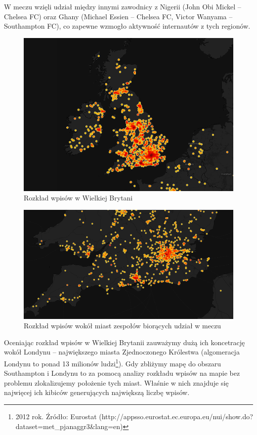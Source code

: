 W meczu wzięli udział między innymi zawodnicy z Nigerii (John Obi Mickel -- Chelsea FC)
oraz Ghany (Michael Essien -- Chelsea FC, Victor Wanyama -- Southampton FC),
co zapewne wzmogło aktywność internautów z tych regionów.


\begin{figure}[ht!]
\centering
\includegraphics[width=140mm]{img/geo-uk-chelsea-southampton.png}
\caption{Rozkład wpisów w Wielkiej Brytani}
\label{image:mapa-uk}
\end{figure}

\begin{figure}[ht!]
\centering
\includegraphics[width=140mm]{img/geo-uk-zoom-chelsea-southampton.png}
\caption{Rozkład wpisów wokół miast zespołów biorących udział w meczu}
\label{image:mapa-uk-zoom}
\end{figure}

Oceniając rozkład wpisów w Wielkiej Brytanii zauważymy dużą ich koncetrację wokół
Londynu -- największego miasta Zjednoczonego Królestwa (algomeracja Londynu to
ponad 13 milionów 
ludzi\footnote{2012 rok. Źródło: Eurostat (http://appsso.eurostat.ec.europa.eu/nui/show.do?dataset=met\_pjanaggr3\&lang=en)}).
Gdy zbliżymy mapę do obszaru Southampton i Londynu to za pomocą analizy rozkładu
wpisów na mapie bez problemu zlokalizujemy położenie tych miast.
Właśnie w nich znajduje się najwięcej ich kibiców generujących
największą liczbę wpisów.

